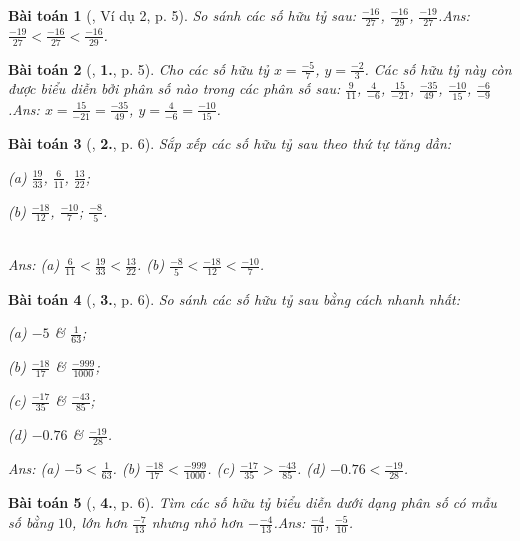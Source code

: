 \documentclass{article}
\numberwithin{equation}{section}
\newtheorem{baitoan}{Bài toán}
\begin{document}
\begin{baitoan}[\cite{Tuyen_Toan_7}, Ví dụ 2, p. 5]
	So sánh các số hữu tỷ sau: $\frac{-16}{27}$, $\frac{-16}{29}$, $\frac{-19}{27}$.\hfill\textsf{Ans:} $\frac{-19}{27} < \frac{-16}{27} < \frac{-16}{29}$.
\end{baitoan}

\begin{baitoan}[\cite{Tuyen_Toan_7}, \textbf{1.}, p. 5]
	Cho các số hữu tỷ $x = \frac{-5}{7}$, $y = \frac{-2}{3}$. Các số hữu tỷ này còn được biểu diễn bởi phân số nào trong các phân số sau: $\frac{9}{11}$, $\frac{4}{-6}$, $\frac{15}{-21}$, $\frac{-35}{49}$, $\frac{-10}{15}$, $\frac{-6}{-9}$.\hfill\textsf{Ans:} $x = \frac{15}{-21} = \frac{-35}{49}$, $y = \frac{4}{-6} = \frac{-10}{15}$.
\end{baitoan}

\begin{baitoan}[\cite{Tuyen_Toan_7}, \textbf{2.}, p. 6]
	Sắp xếp các số hữu tỷ sau theo thứ tự tăng dần:
	\begin{enumerate*}
		\item[(a)] $\frac{19}{33}$, $\frac{6}{11}$, $\frac{13}{22}$;
		\item[(b)] $\frac{-18}{12}$, $\frac{-10}{7}$; $\frac{-8}{5}$.
	\end{enumerate*}\\\mbox{}\hfill\textsf{Ans:} (a) $\frac{6}{11} < \frac{19}{33} < \frac{13}{22}$. (b) $\frac{-8}{5} < \frac{-18}{12} < \frac{-10}{7}$.
\end{baitoan}

\begin{baitoan}[\cite{Tuyen_Toan_7}, \textbf{3.}, p. 6]
	So sánh các số hữu tỷ sau bằng cách nhanh nhất:
	\begin{enumerate*}
		\item[(a)] $-5$ \& $\frac{1}{63}$;
		\item[(b)] $\frac{-18}{17}$ \& $\frac{-999}{1000}$;
		\item[(c)] $\frac{-17}{35}$ \& $\frac{-43}{85}$;
		\item[(d)] $-0.76$ \& $\frac{-19}{28}$.
	\end{enumerate*}\hfill\textsf{Ans:} (a) $-5 < \frac{1}{63}$. (b) $\frac{-18}{17} < \frac{-999}{1000}$. (c) $\frac{-17}{35} > \frac{-43}{85}$. (d) $-0.76 < \frac{-19}{28}$.
\end{baitoan}

\begin{baitoan}[\cite{Tuyen_Toan_7}, \textbf{4.}, p. 6]
	Tìm các số hữu tỷ biểu diễn dưới dạng phân số có mẫu số bằng $10$, lớn hơn $\frac{-7}{13}$ nhưng nhỏ hơn $-\frac{-4}{13}$.\hfill\textsf{Ans:} $\frac{-4}{10}$, $\frac{-5}{10}$.
\end{baitoan}
\end{document}
